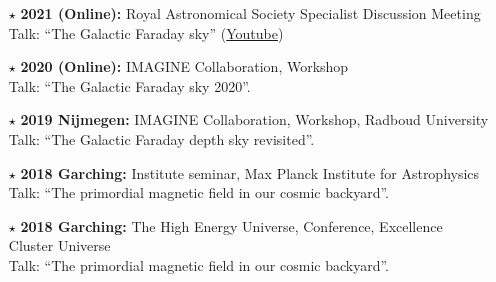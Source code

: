 \documentclass[11pt,a4paper,sans, table, dvipsnames]{moderncv}        %
\begin{document}
\begin{itemize}
\begin{itemize}
    \item[\textcolor{Black}{$\star$}]{\textbf{2021 (Online):} Royal Astronomical Society Specialist Discussion Meeting\\ Talk: ``The Galactic Faraday sky'' (\href{https://www.youtube.com/watch?v=1HM33vWJbUM}{Youtube})}



    \item[\textcolor{Black}{$\star$}]{\textbf{2020 (Online):} IMAGINE Collaboration, Workshop\\ Talk: ``The Galactic Faraday sky 2020''.}

    \item[\textcolor{Black}{$\star$}]{\textbf{2019 Nijmegen:} IMAGINE Collaboration, Workshop, Radboud University\\ Talk: ``The Galactic Faraday depth sky revisited''.}


    \item[\textcolor{Black}{$\star$}]{\textbf{2018 Garching:} Institute seminar, Max Planck Institute for Astrophysics\\ Talk: ``The primordial magnetic field in our cosmic backyard''.}

    \item[\textcolor{Black}{$\star$}]{\textbf{2018 Garching:} The High Energy Universe, Conference, Excellence Cluster Universe \\ Talk: ``The primordial magnetic field in our cosmic backyard''.}



\end{itemize}
\end{itemize}
\end{document}
